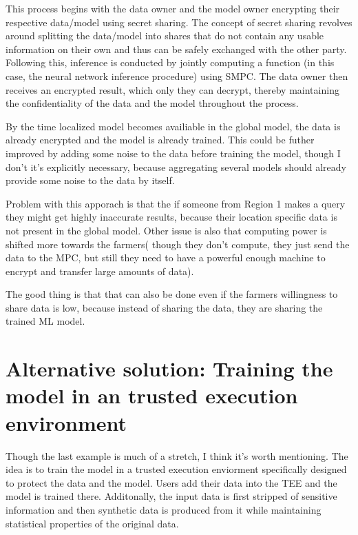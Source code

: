 This process begins with the data owner and the model owner encrypting their respective data/model using secret sharing.
The concept of secret sharing revolves around splitting the data/model into shares that do not contain any usable information on their own and thus can be safely exchanged with the other party.
Following this, inference is conducted by jointly computing a function (in this case, the neural network inference procedure) using SMPC.
The data owner then receives an encrypted result, which only they can decrypt, thereby maintaining the confidentiality of the data and the model throughout the process.

By the time localized model becomes availiable in the global model, the data is already encrypted and the model is already trained. This
could be futher improved by adding some noise to the data before training the model, though I don't it's explicitly necessary, because
aggregating several models should already provide some noise to the data by itself.

Problem with this apporach is that the if someone from Region 1 makes a query they might get highly inaccurate results, because their
location specific data is not present in the global model. Other issue is also that computing power is shifted more towards the farmers(
though they don't compute, they just send the data to the MPC, but still they need to have a powerful enough machine to encrypt and
transfer large amounts of data).

The good thing is that that can also be done even if the farmers willingness to share data is low, because instead of sharing the data,
they are sharing the trained ML model.~\cite[]{mo2022sok}

\section{Alternative solution: Training the model in an trusted execution environment}
Though the last example is much of a stretch, I think it's worth mentioning.
The idea is to train the model in a trusted execution enviorment specifically designed to protect the data and the model.
Users add their data into the TEE and the model is trained there.
Additonally, the input data is first stripped of sensitive information and then synthetic data is produced from it
while maintaining statistical properties of the original data.


